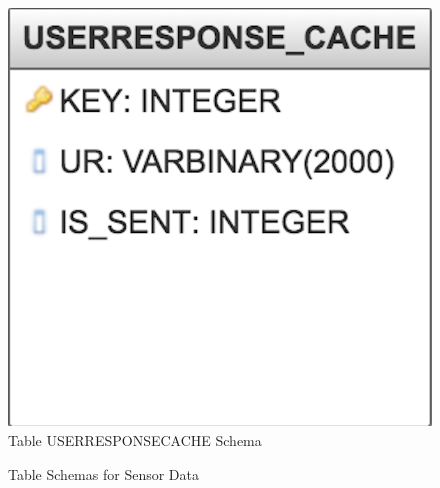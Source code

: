 \begin{figure}[ht!]
\centering
\includegraphics[width=0.4\linewidth]{./images/db_ur}
\caption{Table USERRESPONSECACHE Schema}
\label{fig:db_ur}
\end{figure}

\begin{figure}[htp]
\hspace{1em}
%
\caption{Table Schemas for Sensor Data}
\label{fig:ts2}
\end{figure}


